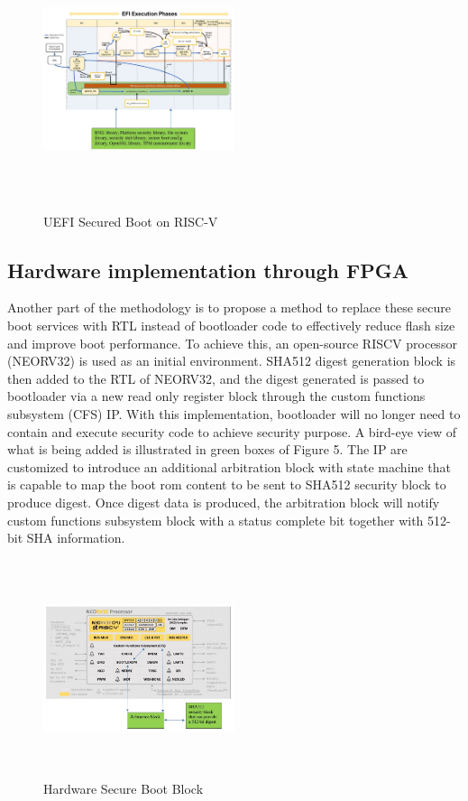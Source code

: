 \documentclass[a4paper,fleqn]{cas-dc}
\begin{document}
\begin{figure}[hbt!]
	\centering
	\includegraphics[width=0.5\textwidth,height=3in]{figs/SecureBootOnRISCV.JPG}
	\caption{UEFI Secured Boot on RISC-V}
\end{figure}

\subsection{ Hardware implementation through FPGA}
Another part of the methodology is to propose a method to replace these secure boot services with RTL instead of bootloader code to effectively reduce flash size and improve boot performance. To achieve this, an open-source RISCV processor (NEORV32) is used as an initial environment. SHA512 digest generation block is then added to the RTL of NEORV32, and the digest generated is passed to bootloader via a new read only register block through the custom functions subsystem (CFS) IP. With this implementation, bootloader will no longer need to contain and execute security code to achieve security purpose. A bird-eye view of what is being added is illustrated in green boxes of Figure 5. The IP are customized to introduce an additional arbitration block with state machine that is capable to map the boot rom content to be sent to SHA512 security block to produce digest. Once digest data is produced, the arbitration block will notify custom functions subsystem block with a status complete bit together with 512-bit SHA information. 

\begin{figure}[hbt!]
	\centering
	\includegraphics[width=0.5\textwidth,height=2.5in]{figs/HardwareSecureBootBlock.JPG}
	\caption{Hardware Secure Boot Block}
\end{figure}
\end{document}
